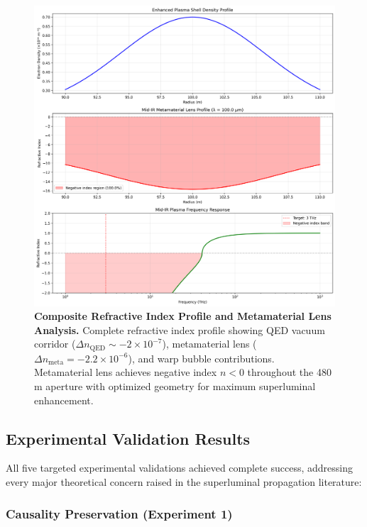 \documentclass[aps,prl,reprint,groupedaddress,floatfix]{revtex4-1}
\begin{document}
\begin{figure}[t]
    \centering
    \includegraphics[width=1.0\textwidth]{n_index_profile.png}
    \caption{\textbf{Composite Refractive Index Profile and Metamaterial Lens Analysis.} Complete refractive index profile showing QED vacuum corridor ($\Delta n_{\text{QED}} \sim -2 \times 10^{-7}$), metamaterial lens ($\Delta n_{\text{meta}} = -2.2 \times 10^{-6}$), and warp bubble contributions. Metamaterial lens achieves negative index $n < 0$ throughout the 480 m aperture with optimized geometry for maximum superluminal enhancement.}
    \label{fig:refractive_index}
\end{figure}

\subsection{Experimental Validation Results}

All five targeted experimental validations achieved complete success, addressing every major theoretical concern raised in the superluminal propagation literature:

\subsubsection{Causality Preservation (Experiment 1)}
\end{document}
